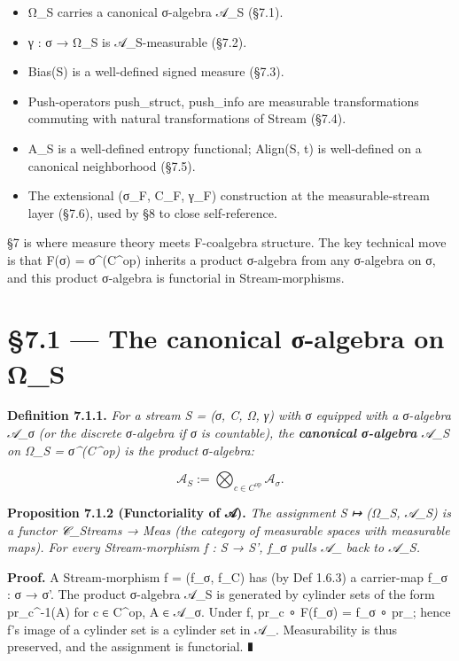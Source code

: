\documentclass[11pt, openany]{book}
\newcommand{\sectionbreak}{\clearpage}
\begin{document}
\begin{itemize}
\item Ω\_\allowbreak{}S carries a canonical σ-algebra 𝒜\_\allowbreak{}S (§7.1).
\item γ : σ → Ω\_\allowbreak{}S is 𝒜\_\allowbreak{}S-measurable (§7.2).
\item Bias(S) is a well-defined signed measure (§7.3).
\item Push-operators push\_\allowbreak{}struct, push\_\allowbreak{}info are measurable transformations commuting with natural transformations of Stream (§7.4).
\item A\_\allowbreak{}S is a well-defined entropy functional; Align(S, t) is well-defined on a canonical neighborhood (§7.5).
\item The extensional (σ\_\allowbreak{}F, C\_\allowbreak{}F, γ\_\allowbreak{}F) construction at the measurable-stream layer (§7.6), used by §8 to close self-reference.
\end{itemize}

§7 is where measure theory meets F-coalgebra structure. The key technical move is that F(σ) = σ\textasciicircum{}(C\textasciicircum{}op) inherits a product σ-algebra from any σ-algebra on σ, and this product σ-algebra is functorial in Stream-morphisms.

\sectionbreak

\section{§7.1 --- The canonical σ-algebra on Ω\_\allowbreak{}S}

\textbf{Definition 7.1.1.} \textit{For a stream S = (σ, C, Ω, γ) with σ equipped with a σ-algebra 𝒜\_\allowbreak{}σ (or the discrete σ-algebra if σ is countable), the \textbf{canonical σ-algebra} 𝒜\_\allowbreak{}S on Ω\_\allowbreak{}S = σ\textasciicircum{}(C\textasciicircum{}op) is the product σ-algebra:}

\[
\mathcal{A}_S := \bigotimes_{c \in C^\mathrm{op}} \mathcal{A}_\sigma.
\]

\textbf{Proposition 7.1.2 (Functoriality of 𝒜).} \textit{The assignment S ↦ (Ω\_\allowbreak{}S, 𝒜\_\allowbreak{}S) is a functor 𝒞\_\allowbreak{}Streams → Meas (the category of measurable spaces with measurable maps). For every Stream-morphism f : S → S', f\_\allowbreak{}σ pulls 𝒜\_ back to 𝒜\_\allowbreak{}S.}

\textbf{Proof.} A Stream-morphism f = (f\_\allowbreak{}σ, f\_\allowbreak{}C) has (by Def 1.6.3) a carrier-map f\_\allowbreak{}σ : σ → σ'. The product σ-algebra 𝒜\_\allowbreak{}S is generated by cylinder sets of the form pr\_\allowbreak{}c\textasciicircum{}{-1}(A) for c ∈ C\textasciicircum{}op, A ∈ 𝒜\_\allowbreak{}σ. Under f, pr\_\allowbreak{}c ∘ F(f\_\allowbreak{}σ) = f\_\allowbreak{}σ ∘ pr\_; hence f's image of a cylinder set is a cylinder set in 𝒜\_. Measurability is thus preserved, and the assignment is functorial. ∎
\end{document}
